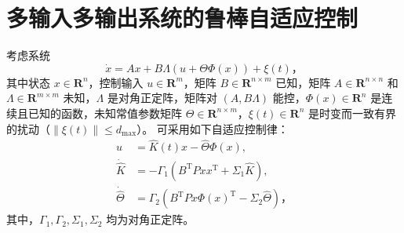 \chapter{多输入多输出系统的鲁棒自适应控制} \label{MIMO_robust}


考虑系统
\begin{equation} \label{MIMO_sys_disturbance}
    \dot{x} = A x + B \Lambda (u + \Theta \Phi(x)) + \xi(t) \text{，}
\end{equation}
其中状态 $x \in \mathbf{R}^n$，控制输入 $u \in \mathbf{R}^m$，矩阵 $B \in \mathbf{R}^{n \times m}$ 已知，矩阵 $A \in \mathbf{R}^{n \times n}$ 和 $\Lambda \in \mathbf{R}^{m \times m}$ 未知，$\Lambda$ 是对角正定阵，矩阵对 $(A, B \Lambda)$ 能控，$\Phi(x) \in \mathbf{R}^n$ 是连续且已知的函数，未知常值参数矩阵 $\Theta \in \mathbf{R}^{n \times m}$，$\xi(t) \in \mathbf{R}^n$ 是时变而一致有界的扰动（$\| \xi(t) \| \leq d_{\mathrm{max}}$）。%
可采用如下自适应控制律：
\begin{align*}
    u &= \hat{K}(t)x - \hat{\Theta}\Phi(x), \\
    \dot{\hat{K}} &= - \Gamma_1 (B^\mathrm{T} P x x^\mathrm{T} + \Sigma_1\hat{K}), \\
    \dot{\hat{\Theta}} &= \Gamma_2(B^\mathrm{T} P x \Phi(x)^\mathrm{T} - \Sigma_2 \hat{\Theta}) \text{，}
\end{align*}
其中，$\Gamma_1, \Gamma_2, \Sigma_1, \Sigma_2$ 均为对角正定阵。

